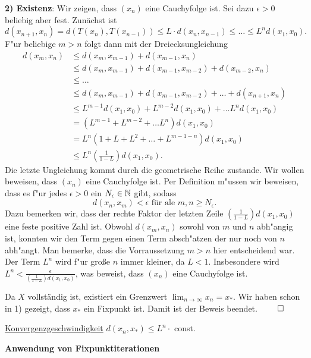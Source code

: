 \documentclass[a4paper,10pt]{article}
\begin{document}
 \vspace{.2cm}
 \noindent
 \textbf{2) Existenz}: 
 Wir zeigen, dass $(x_n)$ eine Cauchyfolge ist. Sei dazu $\epsilon > 0$ beliebig aber fest.
 Zunächst ist 
 \[
  d(x_{n+1}, x_n) = d(T(x_n), T(x_{n-1})) \leq L\cdot d(x_n, x_{n-1})\leq \dots \leq L^n d(x_1, x_0).
 \]
F"ur beliebige $m > n$ folgt dann mit der Dreiecksungleichung
\begin{align*}
 d(x_m, x_n) & \leq d(x_m, x_{m-1}) + d(x_{m-1}, x_n) \\
	     & \leq d(x_m, x_{m-1}) + d(x_{m-1}, x_{m-2}) +d(x_{m-2}, x_n) \\
	     & \leq \dots \\
	     & \leq d(x_m, x_{m-1}) + d(x_{m-1}, x_{m-2})+ \dots +d(x_{n+1}, x_n) \\
	     & \leq L^{m-1} d(x_1, x_0) + L^{m-2}d(x_1, x_0) + \dots L^nd(x_1, x_0) \\
	     & = (L^{m-1} + L^{m-2}+ \dots L^{n})d(x_1, x_0) \\
	     & = L^n(1 + L + L^2 + \dots + L^{m-1-n})d(x_1, x_0) \\
	     & \leq L^n \left(\frac{1}{1-L}\right)d(x_1, x_0).
\end{align*}
Die letzte Ungleichung kommt durch die geometrische Reihe zustande. Wir wollen beweisen, dass
$(x_n)$ eine Cauchyfolge ist. Per Definition m"ussen wir beweisen, dass es f"ur jedes
$\epsilon > 0$ ein 
 $N_\epsilon \in \mathbb{N}$ gibt, sodass
 \[
  d(x_n, x_m) < \epsilon \text{ für ale } m,n \geq N_\epsilon.
 \]
Dazu bemerken wir, dass der rechte Faktor der letzten Zeile $\left(\frac{1}{1-L}\right)d(x_1, x_0)$ 
eine feste positive Zahl ist. Obwohl $ d(x_m, x_n)$ sowohl von $m$ und $n$ abh"angig ist, konnten
wir den Term gegen einen Term absch"atzen der nur noch von $n$ abh"angt. Man bemerke, dass die 
Vorraussetzung $m>n$ hier entscheidend war. Der Term $L^n$ wird f"ur große $n$ immer kleiner, da 
$L<1$. Insbesondere wird $L^n < \frac{\epsilon}{\left(\frac{1}{1-L}\right)d(x_1, x_0)}$, was beweist,
dass $(x_n)$ eine Cauchyfolge ist.

Da $X$ vollständig ist, existiert ein Grenzwert $\lim_{n \to \infty} x_n = x_*$. Wir haben schon in 1)
gezeigt, dass $x_*$ ein Fixpunkt ist. Damit ist der Beweis beendet. $\qed$

\begin{rem*}
 \underline{Konvergenzgeschwindigkeit} $d(x_n, x_*) \leq L^n \cdot$ const.
\end{rem*}

\noindent
\textbf{Anwendung von Fixpunktiterationen}
\end{document}
